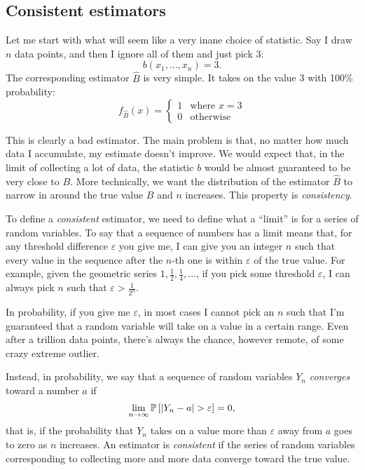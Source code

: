 
\subsection{Consistent estimators}

Let me start with what will seem like a very inane choice of statistic.
Say I draw $n$ data points, and then I ignore all of them and just
pick 3:
\begin{equation}
    b(x_1, \ldots, x_n) = 3.
\end{equation}
The corresponding estimator $\hat{B}$ is very simple. It takes on the
value 3 with 100\% probability:
\begin{equation*}
    f_{\hat{B}}(x) = \begin{cases}
        1 &\text{where } x = 3 \\
        0 &\text{otherwise}
    \end{cases}
\end{equation*}

This is clearly a bad estimator. The main problem is that, no matter how much
data I accumulate, my estimate doesn't improve. We would expect that,
in the limit of
collecting a lot of data, the statistic $b$ would be almost guaranteed to be
very close to $B$. More technically, we want the distribution of the estimator
$\hat{B}$ to narrow in around the true value $B$ and $n$ increases. This
property is \emph{consistency}.

To define a \emph{consistent} estimator, we need to define what a ``limit'' is
for a series of random variables. To say that a sequence of numbers has a limit means that, for any threshold difference
$\varepsilon$ you give me, I can give you an integer $n$ such that every value
in the sequence after the $n$-th one is within $\varepsilon$ of the true value.
For example, given the geometric series $1, \tfrac{1}{2}, \tfrac{1}{4}, \ldots$,
if you pick some threshold $\varepsilon$, I can always pick $n$ such that
$\varepsilon > \tfrac{1}{2^n}$.

In probability, if you give me $\varepsilon$, in most cases I cannot pick an
$n$ such that I'm guaranteed that a random variable will take on a value in a
certain range. Even after a trillion data points, there's always the chance, however
remote, of some crazy extreme outlier.

Instead, in probability, we say that a sequence of random variables $Y_n$
\emph{converges} toward a number $a$ if
\begin{equation}
\lim_{n \to \infty} \mathbb{P}\left[{|Y_n - a| > \varepsilon}\right] = 0,
\end{equation}
that is, if the probability that $Y_n$
takes on a value more than $\varepsilon$ away from $a$ goes to zero as $n$
increases. An estimator is \emph{consistent} if the series of random variables
corresponding to collecting more and more data converge toward the true value.

